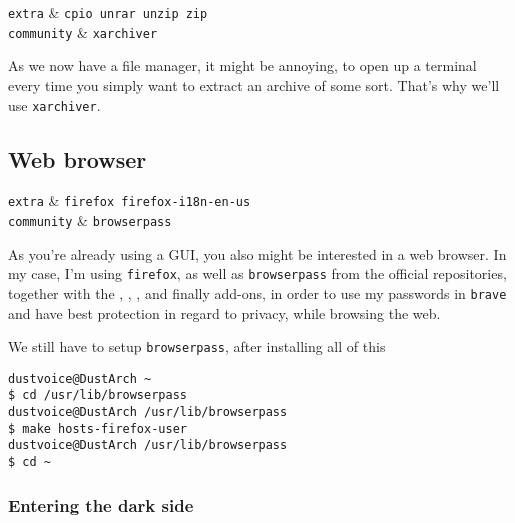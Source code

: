 \documentclass[10pt]{dustdoc}
\begin{document}
\begin{packagetable}
    \texttt{extra} & \texttt{cpio unrar unzip zip} \\ 
    \texttt{community} & \texttt{xarchiver} \\ 
\end{packagetable}

As we now have a file manager, it might be annoying, to open up a terminal every time you simply want to extract an archive of some sort.
That’s why we’ll use \texttt{xarchiver}.

\subsection{Web browser}
\label{sec:web-browser}

\begin{packagetable}
    \texttt{extra} & \texttt{firefox firefox-i18n-en-us} \\ 
    \texttt{community} & \texttt{browserpass} \\ 
\end{packagetable}

As you’re already using a GUI, you also might be interested in a web browser.
In my case, I’m using \texttt{firefox}, as well as \texttt{browserpass} from the official repositories, together with the , , ,  and finally  add-ons, in order to use my passwords in \texttt{brave} and have best protection in regard to privacy, while browsing the web.

We still have to setup \texttt{browserpass}, after installing all of this

\begin{verbatim}
dustvoice@DustArch ~
$ cd /usr/lib/browserpass
dustvoice@DustArch /usr/lib/browserpass
$ make hosts-firefox-user
dustvoice@DustArch /usr/lib/browserpass
$ cd ~
\end{verbatim}

\subsubsection{Entering the dark side}
\label{sec:entering-the-dark-side}
\end{document}
